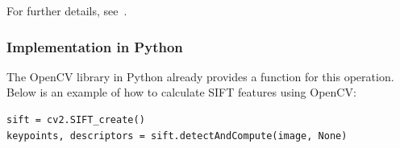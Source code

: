 

For further details, see~\cite{Lowe.2004}.

\subsubsection*{Implementation in Python}
The OpenCV library in Python already provides a function for this operation. Below is an example of how to calculate SIFT features using OpenCV:

\begin{verbatim}
sift = cv2.SIFT_create()
keypoints, descriptors = sift.detectAndCompute(image, None)
\end{verbatim}
